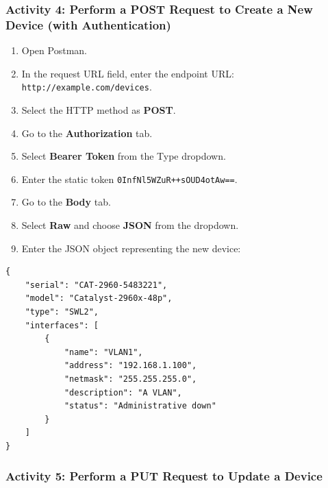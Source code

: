 \documentclass[11pt,a4paper]{article}
\providecommand{\tightlist}{%
  \setlength{\itemsep}{0pt}\setlength{\parskip}{0pt}}
\begin{document}
\subsubsection{Activity 4: Perform a POST Request to Create a New Device
(with
Authentication)}\label{activity-4-perform-a-post-request-to-create-a-new-device-with-authentication}

\begin{enumerate}
\def\labelenumi{\arabic{enumi}.}
\tightlist
\item
  Open Postman.
\item
  In the request URL field, enter the endpoint URL:
  \texttt{http://example.com/devices}.
\item
  Select the HTTP method as \textbf{POST}.
\item
  Go to the \textbf{Authorization} tab.
\item
  Select \textbf{Bearer Token} from the Type dropdown.
\item
  Enter the static token \texttt{0InfNl5WZuR++sOUD4otAw==}.
\item
  Go to the \textbf{Body} tab.
\item
  Select \textbf{Raw} and choose \textbf{JSON} from the dropdown.
\item
  Enter the JSON object representing the new device:
\end{enumerate}

\begin{verbatim}
{
    "serial": "CAT-2960-5483221",
    "model": "Catalyst-2960x-48p",
    "type": "SWL2",
    "interfaces": [
        {
            "name": "VLAN1",
            "address": "192.168.1.100",
            "netmask": "255.255.255.0",
            "description": "A VLAN",
            "status": "Administrative down"
        }
    ]
}
\end{verbatim}

\subsubsection{Activity 5: Perform a PUT Request to Update a
Device}\label{activity-5-perform-a-put-request-to-update-a-device}
\end{document}
